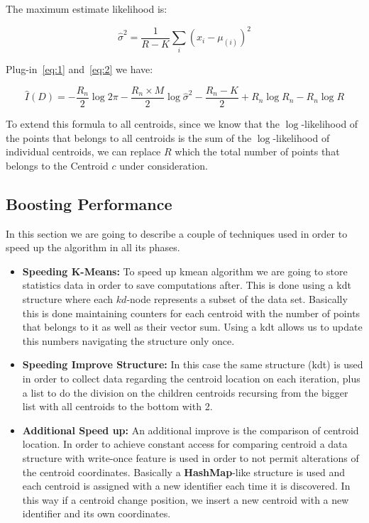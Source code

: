 \documentclass[12pt, a4paper]{article}
\begin{document}
The maximum estimate likelihood is:

\begin{equation}
  \widehat{\sigma}^2 = \frac{1}{R - K} \sum_i \left( x_i - \mu_{(i)} \right)^2\label{eq:2}
\end{equation}

Plug-in~\ref{eq:1} and~\ref{eq:2} we have:

\begin{equation}
  \widehat{I}(D) = -\frac{R_n}{2} \log{2\pi} - \frac{R_n \times M}{2} \log{\widehat{\sigma}^2} - \frac{R_n - K}{2} + R_n\log{R_n} - R_n \log{R}
\end{equation}

To extend this formula to all centroids, since we know that the $\log$-likelihood of the points that belongs to all centroids is the sum of the $\log$-likelihood of individual centroids, we can replace $R$ which the total number of points that belongs to the Centroid $c$ under consideration.

\subsection{Boosting Performance}
In this section we are going to describe a couple of techniques used in order to speed up the algorithm in all its phases.

\begin{itemize}
  \item \textbf{Speeding K-Means:} To speed up \acrlong{kmean} algorithm we are going to store statistics data in order to save computations after. This is done using a \acrlong{kdt} structure where each $kd$-node represents a subset of the data set. Basically this is done maintaining counters for each centroid with the number of points that belongs to it as well as their vector sum. Using a \acrshort{kdt} allows us to update this numbers navigating the structure only once.

  \item \textbf{Speeding Improve Structure:} In this case the same structure (\acrshort{kdt}) is used in order to collect data regarding the centroid location on each iteration, plus a list to do the division on the children centroids recursing from the bigger list with all centroids to the bottom with 2.

  \item \textbf{Additional Speed up:} An additional improve is the comparison of centroid location. In order to achieve constant access for comparing centroid a data structure with write-once feature is used in order to not permit alterations of the centroid coordinates. Basically a \textbf{HashMap}-like structure is used and each centroid is assigned with a new identifier each time it is discovered. In this way if a centroid change position, we insert a new centroid with a new identifier and its own coordinates.
\end{itemize}
\end{document}
